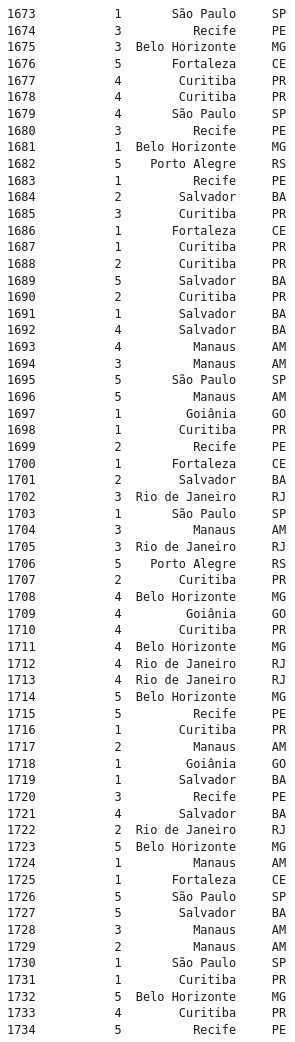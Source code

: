 \documentclass[11pt]{article}
\begin{document}
\begin{Verbatim}[commandchars=\\\{\}]
1673           1       São Paulo     SP  
1674           3          Recife     PE  
1675           3  Belo Horizonte     MG  
1676           5       Fortaleza     CE  
1677           4        Curitiba     PR  
1678           4        Curitiba     PR  
1679           4       São Paulo     SP  
1680           3          Recife     PE  
1681           1  Belo Horizonte     MG  
1682           5    Porto Alegre     RS  
1683           1          Recife     PE  
1684           2        Salvador     BA  
1685           3        Curitiba     PR  
1686           1       Fortaleza     CE  
1687           1        Curitiba     PR  
1688           2        Curitiba     PR  
1689           5        Salvador     BA  
1690           2        Curitiba     PR  
1691           1        Salvador     BA  
1692           4        Salvador     BA  
1693           4          Manaus     AM  
1694           3          Manaus     AM  
1695           5       São Paulo     SP  
1696           5          Manaus     AM  
1697           1         Goiânia     GO  
1698           1        Curitiba     PR  
1699           2          Recife     PE  
1700           1       Fortaleza     CE  
1701           2        Salvador     BA  
1702           3  Rio de Janeiro     RJ  
1703           1       São Paulo     SP  
1704           3          Manaus     AM  
1705           3  Rio de Janeiro     RJ  
1706           5    Porto Alegre     RS  
1707           2        Curitiba     PR  
1708           4  Belo Horizonte     MG  
1709           4         Goiânia     GO  
1710           4        Curitiba     PR  
1711           4  Belo Horizonte     MG  
1712           4  Rio de Janeiro     RJ  
1713           4  Rio de Janeiro     RJ  
1714           5  Belo Horizonte     MG  
1715           5          Recife     PE  
1716           1        Curitiba     PR  
1717           2          Manaus     AM  
1718           1         Goiânia     GO  
1719           1        Salvador     BA  
1720           3          Recife     PE  
1721           4        Salvador     BA  
1722           2  Rio de Janeiro     RJ  
1723           5  Belo Horizonte     MG  
1724           1          Manaus     AM  
1725           1       Fortaleza     CE  
1726           5       São Paulo     SP  
1727           5        Salvador     BA  
1728           3          Manaus     AM  
1729           2          Manaus     AM  
1730           1       São Paulo     SP  
1731           1        Curitiba     PR  
1732           5  Belo Horizonte     MG  
1733           4        Curitiba     PR  
1734           5          Recife     PE  

\end{Verbatim}
\end{document}
